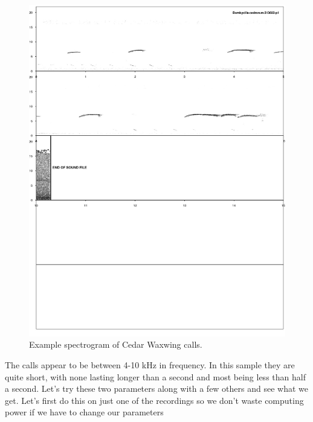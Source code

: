 \documentclass[12pt,oneside]{book}\usepackage[]{graphicx}\usepackage[]{color}
\begin{document}
{{{{\begin{figure}[htbp]
\includegraphics[width=6in]{14-signalProcessing/14-images/sampleSpectrogram.jpg}
\caption{Example spectrogram of Cedar Waxwing calls.}
\label{FIG:SPECTROGRAM}
\end{figure}

The calls appear to be between 4-10 kHz in frequency. In this sample they are quite short, with none lasting longer than a second and most being less than half a second. Let's try these two parameters along with a few others and see what we get. Let's first do this on just one of the recordings so we don't waste computing power if we have to change our parameters  

}}}}
\end{document}
